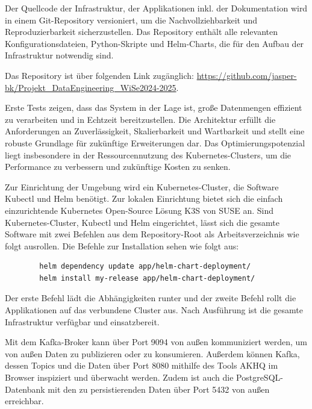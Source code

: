 \documentclass[%
pdftex,
oneside,			%
11pt,				%
parskip=half,		%
headheight = 12pt,	%
headsepline,		%
footsepline,		%
footheight = 16pt,	%
abstracton,		%
DIV=calc,		%
BCOR=8mm,		%
headinclude=false,	%
footinclude=false,	%
listof=totoc,		%
toc=bibliography,	%
]{scrreprt}	%
\begin{document}
    Der Quellcode der Infrastruktur, der Applikationen inkl. der Dokumentation wird in einem Git-Repository versioniert, um die Nachvollziehbarkeit und Reproduzierbarkeit sicherzustellen.
    Das Repository enthält alle relevanten Konfigurationsdateien, Python-Skripte und Helm-Charts, die für den Aufbau der Infrastruktur notwendig sind.

    Das Repository ist über folgenden Link zugänglich:
    \url{https://github.com/jasper-bk/Projekt_DataEngineering_WiSe2024-2025}. %

    Erste Tests zeigen, dass das System in der Lage ist, große Datenmengen effizient zu verarbeiten und in Echtzeit bereitzustellen.
    Die Architektur erfüllt die Anforderungen an Zuverlässigkeit, Skalierbarkeit und Wartbarkeit und stellt eine robuste Grundlage für zukünftige Erweiterungen dar.
    Das Optimierungspotenzial liegt insbesondere in der Ressourcennutzung des Kubernetes-Clusters, um die Performance zu verbessern und zukünftige Kosten zu senken.

    Zur Einrichtung der Umgebung wird ein Kubernetes-Cluster, die Software Kubectl und Helm benötigt.
    Zur lokalen Einrichtung bietet sich die einfach einzurichtende Kubernetes Open-Source Lösung K3S von SUSE an.
    Sind Kubernetes-Cluster, Kubectl und Helm eingerichtet, lässt sich die gesamte Software mit zwei Befehlen aus dem Repository-Root als Arbeitsverzeichnis wie folgt ausrollen.
    Die Befehle zur Installation sehen wie folgt aus:\\
    \begin{lstlisting}
        helm dependency update app/helm-chart-deployment/
        helm install my-release app/helm-chart-deployment/
    \end{lstlisting} %

    Der erste Befehl lädt die Abhängigkeiten runter und der zweite Befehl rollt die Applikationen auf das verbundene Cluster aus.
    Nach Ausführung ist die gesamte Infrastruktur verfügbar und einsatzbereit.

    Mit dem Kafka-Broker kann über Port 9094 von außen kommuniziert werden, um von außen Daten zu publizieren oder zu konsumieren.
    Außerdem können Kafka, dessen Topics und die Daten über Port 8080 mithilfe des Tools AKHQ im Browser inspiziert und überwacht werden.
    Zudem ist auch die PostgreSQL-Datenbank mit den zu persistierenden Daten über Port 5432 von außen erreichbar.
\end{document}
